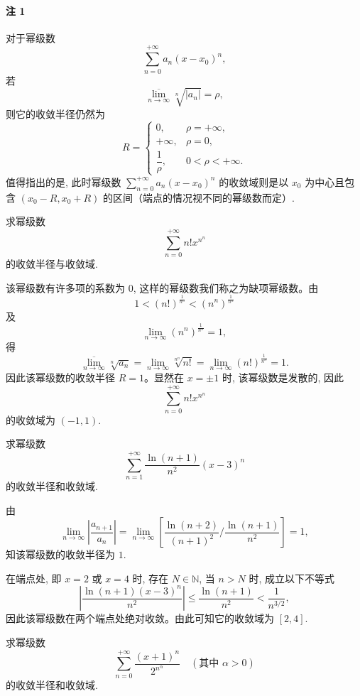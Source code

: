 \paragraph*{注 1}
对于幂级数
\[
  \sum_{n=0}^{+\infty}a_n(x-x_0)^n,
\]
若
\[
  \overline{\lim_{n\to\infty}}\sqrt[n]{|a_n|}=\rho,
\]
则它的收敛半径仍然为
\[
  R=
  \begin{cases}
    0, & \rho=+\infty,\\
    +\infty, & \rho=0,\\
    \dfrac1\rho, & 0<\rho<+\infty.
  \end{cases}
\]
值得指出的是, 此时幂级数 $\sum_{n=0}^{+\infty}a_n(x-x_0)^n$ 的收敛域则是以 $x_0$ 为中心且包含 $(x_0-R,x_0+R)$ 的区间（端点的情况视不同的幂级数而定）.

\begin{example}\label{example:ma-11-1-6}
求幂级数
\[
  \sum_{n=0}^{+\infty}n!x^{n^n}
\]
的收敛半径与收敛域.
\end{example}


\begin{solve}
该幂级数有许多项的系数为 $0$, 这样的幂级数我们称之为缺项幂级数。由
\[
  1<(n!)^{\frac1{n^n}}<(n^n)^{\frac1{n^n}}
\]
及
\[
  \lim_{n\to\infty}(n^n)^{\frac1{n^n}}=1,
\]
得
\[
  \overline{\lim_{n\to\infty}}\sqrt[n]{a_n}
  =
  \lim_{n\to\infty}\sqrt[n^n]{n!}
  =
  \lim_{n\to\infty}(n!)^{\frac1{n^n}}
  =1.
\]
因此该幂级数的收敛半径 $R=1$。显然在 $x=\pm1$ 时, 该幂级数是发散的, 因此
\[
  \sum_{n=0}^{+\infty}n!x^{n^n}
\]
的收敛域为 $(-1,1)$.
\end{solve}


\begin{example}\label{example:ma-11-1-7}
求幂级数
\[
  \sum_{n=1}^{+\infty}\frac{\ln(n+1)}{n^2}(x-3)^n
\]
的收敛半径和收敛域.
\end{example}


\begin{solve}
由
\[
  \lim_{n\to\infty}\left|\frac{a_{n+1}}{a_n}\right|
  =
  \lim_{n\to\infty}
  \left[
    \frac{\ln(n+2)}{(n+1)^2}\Big/\frac{\ln(n+1)}{n^2}
  \right]
  =1,
\]
知该幂级数的收敛半径为 $1$.

在端点处, 即 $x=2$ 或 $x=4$ 时, 存在 $N\in\mathbb N$, 当 $n>N$ 时, 成立以下不等式
\[
  \left|\frac{\ln(n+1)(x-3)^n}{n^2}\right|
  \leqslant
  \frac{\ln(n+1)}{n^2}
  <
  \frac1{n^{3/2}},
\]
因此该幂级数在两个端点处绝对收敛。由此可知它的收敛域为 $[2,4]$.
\end{solve}


\begin{example}\label{example:ma-11-1-8}
求幂级数
\[
  \sum_{n=0}^{+\infty}\frac{(x+1)^n}{2^{n^\alpha}}
  \quad(\text{其中 }\alpha>0)
\]
的收敛半径和收敛域.
\end{example}


